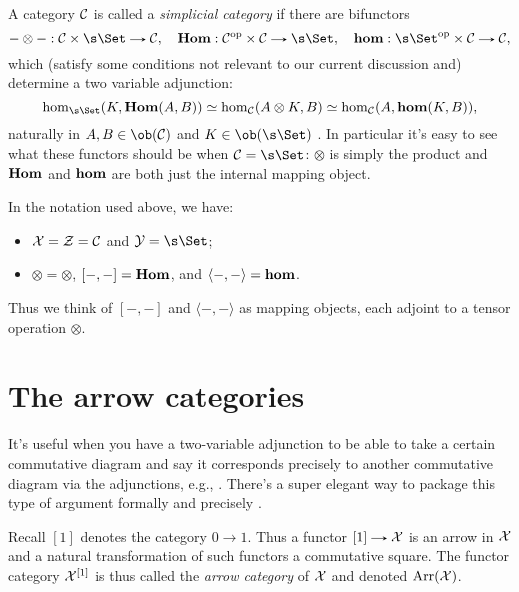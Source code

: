 \begin{example}
  A category $\mathcal{C}$ is called a \emph{simplicial category} if there are
  bifunctors
  \[
  - \otimes - : \C \times \s\Set \to \C, \quad \bHom : \C^\op \times
  \C \to \s\Set, \quad \bhom : \s\Set^\op \times \C \to \C,
  \]
  which (satisfy some conditions not relevant to our current
  discussion and) determine a two variable adjunction:
  \[
  \hom_{\s\Set}(K, \bHom(A,B)) \simeq \hom_\C(A \otimes K, B) \simeq
  \hom_\C(A, \bhom(K,B)),
  \]
  naturally in $A,B \in \ob(\C)$ and $K \in \ob(\s\Set)$
  \cite{goerssjardine}. In particular it's easy to see what these
  functors should be when $\C = \s\Set$: $\otimes$ is simply the
  product and $\operatorname{\textbf{Hom}}$ and $\operatorname{\textbf{hom}}$ are both just the internal mapping
  object.

  \medskip
  In the notation used above, we have:
  \begin{itemize}
  \item $\mathcal{X} = \mathcal{Z} = \mathcal{C}$ and $\Y = \s\Set$;
  \item $\otimes = \otimes$, $[-,-] = \operatorname{\textbf{Hom}}$, and $\langle -,- \rangle
    = \operatorname{\textbf{hom}}$.
  \end{itemize}
  Thus we think of $[-,-]$ and $\langle -,- \rangle$ as mapping
  objects, each adjoint to a tensor operation $\otimes$.
\end{example}


\section{The arrow categories}

It's useful when you have a two-variable adjunction to be able to take
a certain commutative diagram and say it corresponds precisely to
another commutative diagram via the adjunctions, e.g.,
\cite[I.5.2]{goerssjardine}. There's a super elegant way to package
this type of argument formally and precisely \cite{riehl-personal}.

\newcommand{\Arr}{\operatorname{Arr}}

\begin{definition}
  Recall $[1]$ denotes the category $0 \to 1$. Thus a functor $[1]
  \to \X$ is an arrow in $\mathcal{X}$ and a natural transformation of such
  functors a commutative square. The functor category $\mathcal{X}^{[1]}$ is
  thus called the \emph{arrow category} of $\mathcal{X}$ and denoted
  $\Arr(\X)$.
\end{definition}

